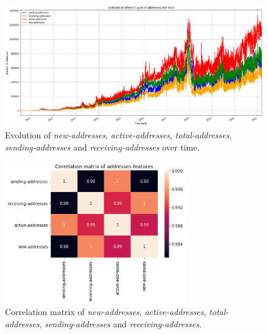 \begin{figure}[H]
    \centering
    \includegraphics[width=\textwidth]{methods/images/addresses.png}
    \caption{Evolution of \emph{new-addresses}, \emph{active-addresses}, \emph{total-addresses},
\emph{sending-addresses} and \emph{receiving-addresses} over time.}
    \label{fig:addresses}
\end{figure}

\begin{figure}[H]
    \centering
    \includegraphics[width=0.7\textwidth]{methods/images/addresses_correlation_mat.png}
    \caption{Correlation matrix of \emph{new-addresses}, \emph{active-addresses}, \emph{total-addresses},
\emph{sending-addresses} and \emph{receiving-addresses}.}
    \label{fig:addresses_correlation}
\end{figure}

